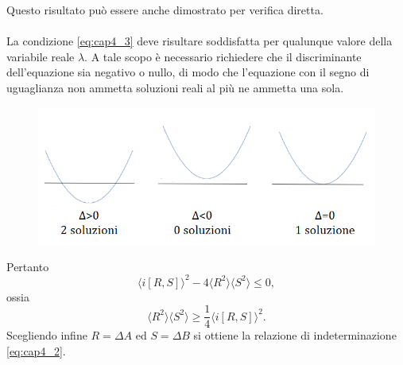 Questo risultato può essere anche dimostrato per verifica diretta.\\ 
\\
La condizione \eqref{eq:cap4_3} deve risultare soddisfatta per qualunque valore della variabile reale $\lambda$. A tale scopo è necessario richiedere che il discriminante dell'equazione sia negativo o nullo, di modo che l'equazione con il segno di uguaglianza non ammetta soluzioni reali  al più ne ammetta una sola.
\newpage
\begin{figure}[!htbp]
\begin{center}
\includegraphics[width=.9\textwidth]{immagini/cap_4/fig_4_1.png}
\end{center}
\end{figure}
Pertanto
\begin{equation}
\langle i \left[R,S \right] \rangle ^2 - 4\langle R^2 \rangle \langle S^2 \rangle \leq 0,
\end{equation}
ossia
\begin{equation}
\langle R^2 \rangle \langle S^2 \rangle \geq \frac{1}{4}\langle i \left[R,S \right] \rangle ^2.
\end{equation}
Scegliendo infine $R=\Delta A$ ed $S= \Delta B$ si ottiene la relazione di indeterminazione \eqref{eq:cap4_2}.
